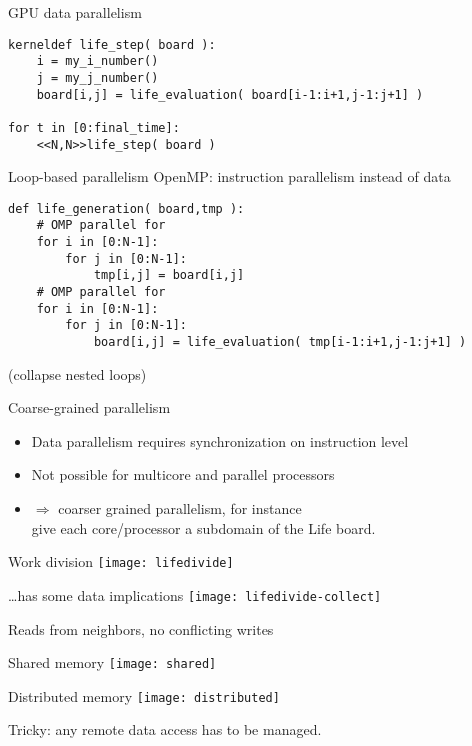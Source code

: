 \begin{frame}[fragile]{GPU data parallelism}
\begin{verbatim}
kerneldef life_step( board ):
    i = my_i_number()
    j = my_j_number()
    board[i,j] = life_evaluation( board[i-1:i+1,j-1:j+1] )

for t in [0:final_time]:
    <<N,N>>life_step( board )
\end{verbatim}
\end{frame}

\begin{frame}[fragile]{Loop-based parallelism}
OpenMP: instruction parallelism instead of data
\small
\begin{verbatim}
def life_generation( board,tmp ):
    # OMP parallel for
    for i in [0:N-1]:
        for j in [0:N-1]:
            tmp[i,j] = board[i,j]
    # OMP parallel for
    for i in [0:N-1]:
        for j in [0:N-1]:
            board[i,j] = life_evaluation( tmp[i-1:i+1,j-1:j+1] )
\end{verbatim}
(collapse nested loops)
\end{frame}

\begin{frame}{Coarse-grained parallelism}
  \begin{itemize}
  \item Data parallelism requires synchronization on instruction level
  \item Not possible for multicore and parallel processors
  \item $\Rightarrow$ coarser grained parallelism, for instance\\
    give each core/processor a subdomain of the Life board.
  \end{itemize}
\end{frame}

\begin{frame}{Work division}
  \texttt{[image: lifedivide]}
\end{frame}

\begin{frame}{\ldots has some data implications}
  \texttt{[image: lifedivide-collect]}

  Reads from neighbors, no conflicting writes
\end{frame}

\begin{frame}{Shared memory}
  \texttt{[image: shared]}
\end{frame}

\begin{frame}{Distributed memory}
  \texttt{[image: distributed]}

  Tricky: any remote data access has to be managed.
\end{frame}

